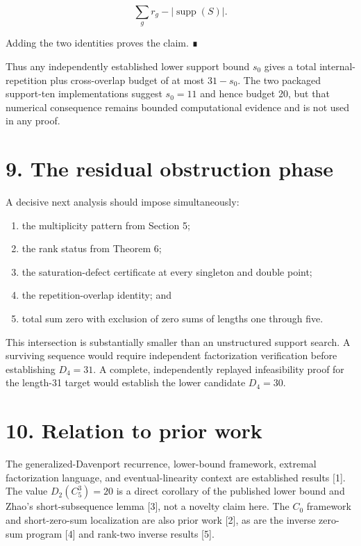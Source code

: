 \documentclass[
  11pt,
]{article}
\providecommand{\tightlist}{%
  \setlength{\itemsep}{0pt}\setlength{\parskip}{0pt}}
\begin{document}
\[
\sum_g r_g-|\operatorname{supp}(S)|.
\]

Adding the two identities proves the claim. ∎

Thus any independently established lower support bound \(s_0\) gives a
total internal-repetition plus cross-overlap budget of at most
\(31-s_0\). The two packaged support-ten implementations suggest
\(s_0=11\) and hence budget 20, but that numerical consequence remains
bounded computational evidence and is not used in any proof.

\hypertarget{the-residual-obstruction-phase}{%
\section{9. The residual obstruction
phase}\label{the-residual-obstruction-phase}}

A decisive next analysis should impose simultaneously:

\begin{enumerate}
\def\labelenumi{\arabic{enumi}.}
\tightlist
\item
  the multiplicity pattern from Section 5;
\item
  the rank status from Theorem 6;
\item
  the saturation-defect certificate at every singleton and double point;
\item
  the repetition-overlap identity; and
\item
  total sum zero with exclusion of zero sums of lengths one through
  five.
\end{enumerate}

This intersection is substantially smaller than an unstructured support
search. A surviving sequence would require independent factorization
verification before establishing \(D_4=31\). A complete, independently
replayed infeasibility proof for the length-31 target would establish
the lower candidate \(D_4=30\).

\hypertarget{relation-to-prior-work}{%
\section{10. Relation to prior work}\label{relation-to-prior-work}}

The generalized-Davenport recurrence, lower-bound framework, extremal
factorization language, and eventual-linearity context are established
results {[}1{]}. The value \(D_2(C_5^3)=20\) is a direct corollary of
the published lower bound and Zhao's short-subsequence lemma {[}3{]},
not a novelty claim here. The \(C_0\) framework and short-zero-sum
localization are also prior work {[}2{]}, as are the inverse zero-sum
program {[}4{]} and rank-two inverse results {[}5{]}.
\end{document}
